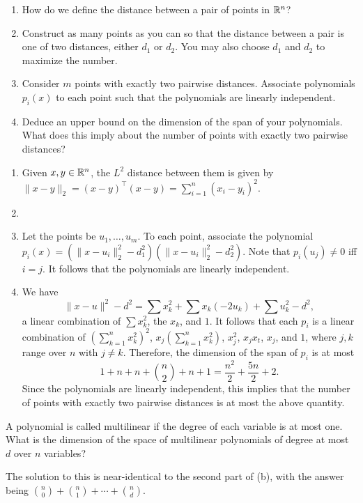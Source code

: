 \documentclass{article}
\begin{document}
	\begin{exercise}
		\phantom{pain}
		\begin{enumerate}[label=(\alph*)]
			\item How do we define the distance between a pair of points in $\mathbb{R}^n$?
			\item Construct as many points as you can so that the distance between a pair is one of two distances, either $d_1$ or $d_2$. You may also choose $d_1$ and $d_2$ to maximize the number.
			\item Consider $m$ points with exactly two pairwise distances. Associate polynomials $p_i(x)$ to each point such that the polynomials are linearly independent.
			\item Deduce an upper bound on the dimension of the span of your polynomials. What does this imply about the number of points with exactly two pairwise distances?
		\end{enumerate}
	\end{exercise}
	\begin{solution*}
		\begin{enumerate}[label=(\alph*)]
			\item Given $x,y \in \mathbb{R}^n$, the $L^2$ distance between them is given by $\|x-y\|_2 = (x-y)^\top(x-y) = \sum_{i=1}^n (x_i - y_i)^2$.
			\item 
			\item Let the points be $u_1,\ldots,u_m$. To each point, associate the polynomial $p_i(x) = (\|x-u_i\|_2^2 - d_1^2)(\|x-u_i\|_2^2 - d_2^2)$. Note that $p_i(u_j) \ne 0$ iff $i = j$. It follows that the polynomials are linearly independent.
			\item We have
			\[ \|x-u\|^2 - d^2 = \sum x_k^2 + \sum x_k (-2u_k) + \sum u_k^2 - d^2, \]
			a linear combination of $\sum x_k^2$, the $x_k$, and $1$. It follows that each $p_i$ is a linear combination of $\left(\sum_{k=1}^n x_k^2\right)^2$, $x_j \left( \sum_{k=1}^n x_k^2 \right)$, $x_j^2$, $x_jx_t$, $x_j$, and $1$, where $j,k$ range over $n$ with $j \ne k$. Therefore, the dimension of the span of $p_i$ is at most
			\[ 1 + n + n + \binom{n}{2} + n + 1 = \frac{n^2}{2} + \frac{5n}{2} + 2. \]
			Since the polynomials are linearly independent, this implies that the number of points with exactly two pairwise distances is at most the above quantity. 
		\end{enumerate}
	\end{solution*}

	\begin{exercise}
		A polynomial is called multilinear if the degree of each variable is at most one. What is the dimension of the space of multilinear polynomials of degree at most $d$ over $n$ variables?
	\end{exercise}
	\begin{solution*}
		The solution to this is near-identical to the second part of (b), with the answer being $\binom{n}{0} + \binom{n}{1} + \cdots + \binom{n}{d}$.
	\end{solution*}
\end{document}
